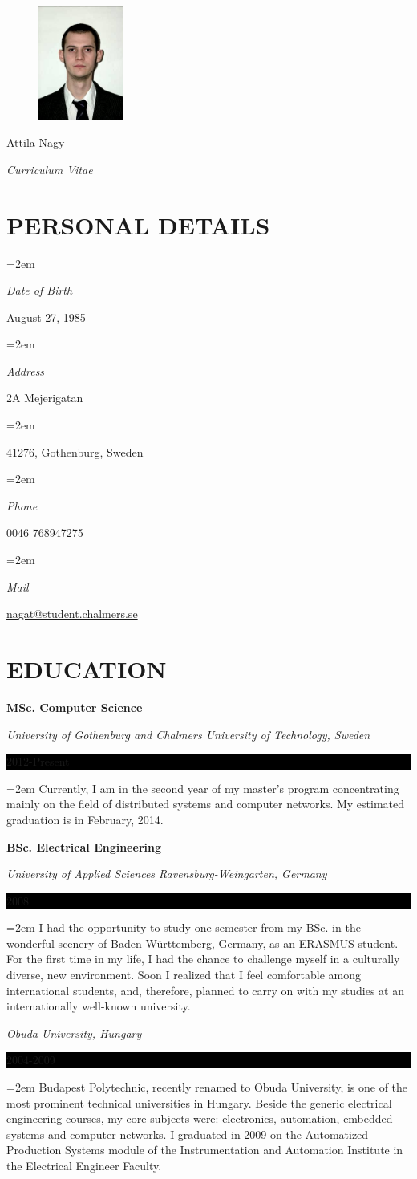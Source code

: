 \documentclass[paper=a4,fontsize=11pt]{scrartcl}	 			%
\newlength{\spacebox}
\newcommand{\sepspace}{\vspace*{1em}}			%
\newcommand{\MyName}[1]{
		\Huge \usefont{OT1}{phv}{b}{n} \hfill #1 		%
		\par \normalsize \normalfont}
\newcommand{\MySlogan}[1]{
		\large \usefont{OT1}{phv}{m}{n}\hfill \textit{#1} %
		\par \normalsize \normalfont}
\newcommand{\NewPart}[1]{\section*{\uppercase{#1}}}
\newcommand{\PersonalEntry}[2]{
		\noindent\hangindent=2em\hangafter=0 		%
		\parbox{\spacebox}{						%
		\textit{#1}}								%
		\hspace{1.5em} #2 \par}					%
\newcommand{\EducationEntry}[4]{
		\noindent \textbf{#1} \par 					%
		\noindent \textit{#3} \hfill					%
		\colorbox{Black}{%
			\parbox{6em}{%
			\hfill\color{White}#2}} \par				%
		\noindent\hangindent=2em\hangafter=0 \small #4 	%
		\normalsize \par}
\begin{document}
\begin{figure}
  \vspace*{-8em}
    \includegraphics[width=0.25\textwidth]{photo}
\end{figure}

\MyName{Attila Nagy}
\MySlogan{Curriculum Vitae}

\sepspace

\NewPart{Personal details}{}

\PersonalEntry{Date of Birth}{August 27, 1985}
\PersonalEntry{Address}{2A Mejerigatan}
\PersonalEntry{}{41276, Gothenburg, Sweden}
\PersonalEntry{Phone}{0046 768947275}
\PersonalEntry{Mail}{\url{nagat@student.chalmers.se}}

\NewPart{Education}{}

\EducationEntry{MSc. Computer Science}{2012-Present}{University of Gothenburg and Chalmers University of Technology, Sweden}{Currently, I am in the second year of my master's program concentrating mainly on the field of distributed systems and computer networks. My estimated graduation is in February, 2014.}
\sepspace
\EducationEntry{BSc. Electrical Engineering}{2008}{University of Applied Sciences Ravensburg-Weingarten, Germany}{I had the opportunity to study one semester from my BSc. in the wonderful scenery of Baden-Württemberg, Germany, as an ERASMUS student. For the first time in my life, I had the chance to challenge myself in a culturally diverse, new environment. Soon I realized that I feel comfortable among international students, and, therefore, planned to carry on with my studies at an internationally well-known university.}
\EducationEntry{}{2004-2009}{Obuda University, Hungary}{Budapest Polytechnic, recently renamed to Obuda University, is one of the most prominent technical universities in Hungary. Beside the generic electrical engineering courses, my core subjects were: electronics, automation, embedded systems and computer networks. I graduated in 2009 on the Automatized Production Systems module of the Instrumentation and Automation Institute in the Electrical Engineer Faculty.}
\end{document}
